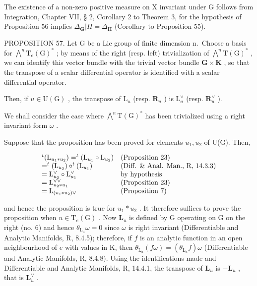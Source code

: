 The existence of a non-zero positive measure on X invariant under G follows from Integration, Chapter VII, § 2, Corollary 2 to Theorem 3, for the hypothesis of Proposition 56 implies \(\Delta_{\mathbf{G}}|H = \Delta_{\mathbf{H}}\) (Corollary to Proposition 55).

PROPOSITION 57. Let G be a Lie group of finite dimension n.~Choose a basis for \(\bigwedge^{n}\mathrm{T}_{e}(\mathrm{G})^{*}\) ; by means of the right (resp. left) trivialization of \(\bigwedge^{n}\mathrm{T}(\mathrm{G})^{*}\) , we can identify this vector bundle with the trivial vector bundle \(\mathbf{G} \times \mathbf{K}\) , so that the transpose of a scalar differential operator is identified with a scalar differential operator.

Then, if \(u \in \mathrm{U}(\mathrm{G})\) , the transpose of \(\mathrm{L}_u\) (resp. \(\mathbf{R}_u\) ) is \(\mathrm{L}_u^\vee\) (resp. \(\mathbf{R}_u^\vee\) ).

We shall consider the case where \(\bigwedge^{n}\mathrm{T}(\mathrm{G})^{*}\) has been trivialized using a right invariant form \(\omega\) .

Suppose that the proposition has been proved for elements \(u_{1}, u_{2}\) of U(G). Then,

\[
\begin{array}{l l} ^ {t} (\mathrm{L} _ {u _ {1} * u _ {2}}) = ^ {t} (\mathrm{L} _ {u _ {1}} \circ \mathrm{L} _ {u _ {2}}) & \text {(Proposition 23)} \\ = ^ {t} (\mathrm{L} _ {u _ {2}}) \circ^ {t} (\mathrm{L} _ {u _ {1}}) & \text {(Diff. \& Anal. Man., R, 14.3.3)} \\ = \mathrm{L} _ {u _ {2}} ^ {\vee} \circ \mathrm{L} _ {u _ {1}} ^ {\vee} & \text {by hypothesis} \\ = \mathrm{L} _ {u _ {2} * u _ {1}} ^ {\vee \vee} & \text {(Proposition 23)} \\ = \mathrm{L} _ {(u _ {1} * u _ {2}) \vee} & \text {(Proposition 7)} \end{array}
\]

and hence the proposition is true for \(u_{1} * u_{2}\) . It therefore suffices to prove the proposition when \(u \in \mathrm{T}_{e}(\mathrm{G})\) . Now \(\mathbf{L}_u\) is defined by G operating on G on the right (no. 6) and hence \(\theta_{\mathrm{L}_u}\omega = 0\) since \(\omega\) is right invariant (Differentiable and Analytic Manifolds, R, 8.4.5); therefore, if \(f\) is an analytic function in an open neighbourhood of \(e\) with values in K, then \(\theta_{\mathrm{L}_u}(f\omega) = (\theta_{\mathrm{L}_u}f)\omega\) (Differentiable and Analytic Manifolds, R, 8.4.8). Using the identifications made and Differentiable and Analytic Manifolds, R, 14.4.1, the transpose of \(\mathbf{L}_u\) is \(-\mathbf{L}_u\) , that is \(\mathbf{L}_u^\vee\) .

